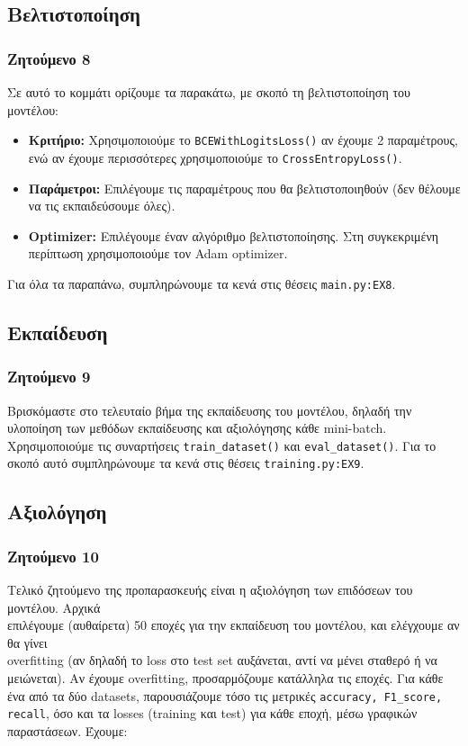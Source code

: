 \documentclass[a4paper, 12pt]{article}
\begin{document}
    \subsection{Βελτιστοποίηση}
        \subsubsection*{Ζητούμενο 8}
            Σε αυτό το κομμάτι ορίζουμε τα παρακάτω, με σκοπό τη βελτιστοποίηση του μοντέλου:
            
            \begin{itemize}
                \item \textbf{Κριτήριο:} Χρησιμοποιούμε το \verb|BCEWithLogitsLoss()| αν έχουμε 2 παραμέτρους, ενώ αν έχουμε περισσότερες χρησιμοποιούμε το \verb|CrossEntropyLoss()|. 
                \item \textbf{Παράμετροι:} Επιλέγουμε τις παραμέτρους που θα βελτιστοποιηθούν (δεν θέλουμε να τις εκπαιδεύσουμε όλες).
                \item \textbf{Optimizer:} Επιλέγουμε έναν αλγόριθμο βελτιστοποίησης. Στη συγκεκριμένη περίπτωση χρησιμοποιούμε τον Adam optimizer.
            \end{itemize}
            
            Για όλα τα παραπάνω, συμπληρώνουμε τα κενά στις θέσεις \verb|main.py:EX8|.
            
    \subsection{Εκπαίδευση}
        \subsubsection*{Ζητούμενο 9}
            Βρισκόμαστε στο τελευταίο βήμα της εκπαίδευσης του μοντέλου, δηλαδή την υλοποίηση των μεθόδων εκπαίδευσης και αξιολόγησης κάθε mini-batch. Χρησιμοποιούμε τις συναρτήσεις \verb|train_dataset()| και \verb|eval_dataset()|. Για το σκοπό αυτό συμπληρώνουμε τα κενά στις θέσεις \verb|training.py:EX9|.
            
    \subsection{Αξιολόγηση}
        \subsubsection*{Ζητούμενο 10}
            Τελικό ζητούμενο της προπαρασκευής είναι η αξιολόγηση των επιδόσεων του μοντέλου. Αρχικά \\ επιλέγουμε (αυθαίρετα) 50 εποχές για την εκπαίδευση του μοντέλου, και ελέγχουμε αν θα γίνει \\ overfitting (αν δηλαδή το loss στο test set αυξάνεται, αντί να μένει σταθερό ή να μειώνεται). Αν έχουμε overfitting, προσαρμόζουμε κατάλληλα τις εποχές. Για κάθε ένα από τα δύο datasets, παρουσιάζουμε τόσο τις μετρικές \verb|accuracy, F1_score, recall|, όσο και τα losses (training και test) για κάθε εποχή, μέσω γραφικών παραστάσεων. Έχουμε:
            
\end{document}
